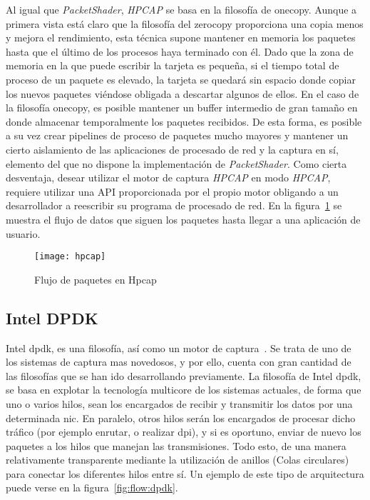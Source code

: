 Al igual que \textit{PacketShader}, \textit{HPCAP} se basa en la filosofía de \gls{onecopy}. Aunque a primera vista está claro que la filosofía del \gls{zerocopy} proporciona una copia menos y mejora el rendimiento, esta técnica supone mantener en memoria los paquetes hasta que el último de los procesos haya terminado con él. Dado que la zona de memoria en la que puede escribir la tarjeta es pequeña, si el tiempo total de proceso de un paquete es elevado, la tarjeta se quedará sin espacio donde copiar los nuevos paquetes viéndose obligada a descartar algunos de ellos. En el caso de la filosofía \gls{onecopy}, es posible mantener un buffer intermedio de gran tamaño en donde almacenar temporalmente los paquetes recibidos. De esta forma, es posible a su vez crear pipelines de proceso de paquetes mucho mayores y mantener un cierto aislamiento de las aplicaciones de procesado de red y la captura en sí, elemento del que no dispone la implementación de \textit{PacketShader}.
Como cierta desventaja, desear utilizar el motor de captura \textit{HPCAP} en modo \textit{HPCAP}, requiere utilizar una API proporcionada por el propio motor obligando a un desarrollador a reescribir su programa de procesado de red.
En la figura~\ref{fig:flow:hpcap} se muestra el flujo de datos que siguen los paquetes hasta llegar a una aplicación de usuario.


\begin{figure}[!bth]
\centering
\texttt{[image: hpcap]}
\caption{Flujo de paquetes en Hpcap}
\label{fig:flow:hpcap}
\end{figure}

\newpage
\subsection{Intel DPDK}
Intel \gls{dpdk}, es una filosofía, así como un motor de captura~\cite{dpdk:whitepaper:whydpdk,dpdk2015}. Se trata de uno de los sistemas de captura mas novedosos, y por ello, cuenta con gran cantidad de las filosofías que se han ido desarrollando previamente. La filosofía de Intel \gls{dpdk}, se basa en explotar la tecnología multicore de los sistemas actuales, de forma que uno o varios hilos, sean los encargados de recibir y transmitir los datos por una determinada \gls{nic}. En paralelo, otros hilos serán los encargados de procesar dicho tráfico (por ejemplo enrutar, o realizar \gls{dpi}), y si es oportuno, enviar de nuevo los paquetes a los hilos que manejan las transmisiones. Todo esto, de una manera relativamente transparente mediante la utilización de anillos (Colas circulares) para conectar los diferentes hilos entre sí. Un ejemplo de este tipo de arquitectura puede verse en la figura~\ref{fig:flow:dpdk}. 

